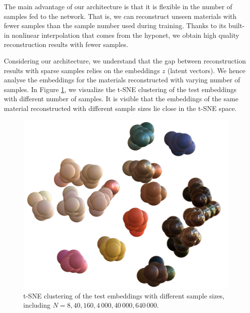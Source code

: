 The main advantage of our architecture is that it is flexible in the number of samples fed to the network. That is, we can reconstruct unseen materials with fewer samples than the sample number used during training. Thanks to its built-in nonlinear interpolation that comes from the hyponet, we obtain high quality reconstruction results with fewer samples. 

Considering our architecture, we understand that the gap between reconstruction results with sparse samples relies on the embeddings $z$ (latent vectors). We hence analyse the embeddings for the materials reconstructed with varying number of samples. In Figure \ref{fig:tsne-vis-imputation}, we visualize 
the t-SNE clustering of the test embeddings with different number of samples. It is visible that the embeddings of the same material reconstructed with different sample sizes lie close in the t-SNE space.

\begin{figure}[t]
  \centering
   \includegraphics[width=0.8\linewidth]{Chapters/hyperbrdf-figs/tsne6_2_den1-cropped-compressed.pdf}
   \caption{t-SNE clustering of the test embeddings with different sample sizes, including $N=8, 40, 160, 4\,000, 40\,000, 640\,000$.}

   \label{fig:tsne-vis-imputation}
\end{figure}


